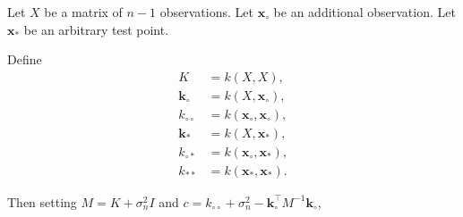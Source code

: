 \documentclass{article}
\newcommand{\bfk}{\mathbf{k}}
\newcommand{\bfx}{\mathbf{x}}
\begin{document}
  Let $X$ be a matrix of $n-1$ observations. Let $\bfx_\circ$ be an additional
  observation. Let $\bfx_*$ be an arbitrary test point.

  Define \begin{align*}
    K &= k(X, X) \text{,} \\
    \bfk_\circ &= k(X, \bfx_\circ) \text{,} \\
    k_{\circ\circ} &= k(\bfx_\circ, \bfx_\circ) \text{,} \\
    \bfk_* &= k(X, \bfx_*) \text{,} \\
    k_{\circ*} &= k(\bfx_\circ, \bfx_*) \text{,} \\
    k_{**} &= k(\bfx_*, \bfx_*) \text{.}
  \end{align*}

  Then setting $M = K + \sigma^2_n I$ and
  $c = k_{\circ\circ} + \sigma^2_n - \bfk_\circ^\top M^{-1}\bfk_\circ$,
\end{document}
